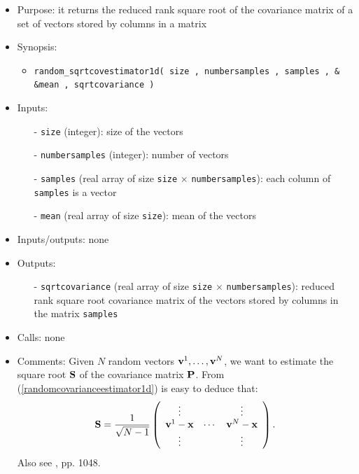 \documentclass[12pt]{article}
\begin{document}
\begin{itemize}
\item Purpose: it returns the reduced rank square root of the covariance matrix of a set of vectors stored by columns in a matrix
\item Synopsis: 
\begin{itemize}
\item {\tt random\_sqrtcovestimator1d( size , numbersamples , samples , \& \\ \&mean , sqrtcovariance )}
\end{itemize}
\item Inputs: 
\begin{itemize}
\item[-] {\tt size} (integer): size of the vectors 
\item[-] {\tt numbersamples} (integer): number of vectors
\item[-] {\tt samples} (real array of size {\tt size} $\times$ {\tt numbersamples}): each column of {\tt samples} is a vector
\item[-] {\tt mean} (real array of size {\tt size}): mean of the vectors
\end{itemize}
\item Inputs/outputs: none
\item Outputs:
\begin{itemize}
\item[-] {\tt sqrtcovariance} (real array of size {\tt size} $\times$ {\tt numbersamples}): reduced rank square root covariance matrix of the vectors stored by columns in the matrix {\tt samples}
\end{itemize}
\item Calls: none
\item Comments: Given $N$ random vectors ${\bf v}^1, \ldots, {\bf v}^N$, we want to estimate the square root ${\bf S}$ of the covariance matrix ${\bf P}$. From (\ref{randomcovarianceestimator1d}) is easy to deduce that:
\begin{equation}
{\bf S} = \frac{1}{\sqrt{N-1}} \left( \begin{array}{ccc} \vdots & & \vdots \\ {\bf v}^1 - {\bf x} & \cdots & {\bf v}^N - {\bf x} \\ \vdots & & \vdots \end{array} \right).
\end{equation}
Also see \cite{treebushnymadsen2005}, pp. 1048.
\end{itemize} 

\end{document}
